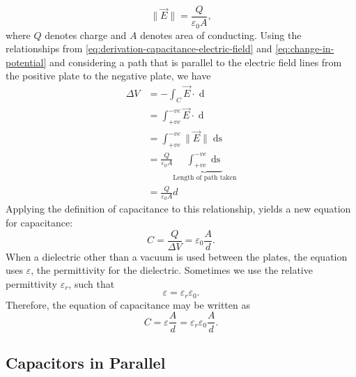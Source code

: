 \begin{equation}
    \label{eq:derivation-capacitance-electric-field}
    \| \vec{E} \| = \frac{Q}{\varepsilon_0 A},
\end{equation}
where $Q$ denotes charge and $A$ denotes area of conducting. Using the relationships from  \ref{eq:derivation-capacitance-electric-field} and \ref{eq:change-in-potential} and considering a path that is parallel to the electric field lines from the positive plate to the negative plate, we have
\begin{align*}
    \Delta V &= - \int_C \vec{E} \cdot \mathop{\mathrm{d}\vec{s}} \\
    &= \int_{+ve}^{-ve} \vec{E} \cdot \mathop{\mathrm{d}\vec{s}} \\ 
    &= \int_{+ve}^{-ve} \| \vec{E} \| \mathop{\mathrm{d}s} \\
    &= \frac{Q}{\varepsilon_0 A} \underbrace{\int_{+ve}^{-ve} \mathop{\mathrm{d}s}}_{\text{Length of path taken}} \\
    &= \frac{Q}{\varepsilon_0 A} d
\end{align*}
Applying the definition of capacitance to this relationship, yields a new equation for capacitance:
\begin{equation}
    C = \frac{Q}{\Delta V} = \varepsilon_0 \frac{A}{d}.
\end{equation}
When a dielectric other than a vacuum is used between the plates, the equation uses $\varepsilon$, the permittivity for the dielectric. Sometimes we use the relative permittivity $\varepsilon_r$, such that
\begin{equation}
    \varepsilon = \varepsilon_r \varepsilon_0.
\end{equation}
Therefore, the equation of capacitance may be written as
\begin{equation}
    C = \varepsilon \frac{A}{d} = \varepsilon_r \varepsilon_0 \frac{A}{d}.
\end{equation}



\subsection{Capacitors in Parallel}

